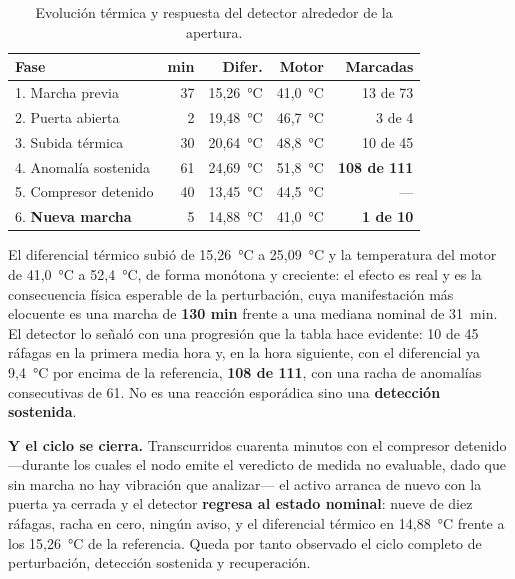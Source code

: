 \begin{table}[ht!]
\caption{Evolución térmica y respuesta del detector alrededor de la apertura.}
\label{table:puerta-termico}
\centering
\begin{tabular}{|p{4.4cm}|r|r|r|r|}
\hline
\textbf{Fase} & \textbf{min} & \textbf{Difer.} & \textbf{Motor} & \textbf{Marcadas} \\
\hline
1. Marcha previa & 37 & \mbox{15,26 °C} & \mbox{41,0 °C} & 13 de 73 \\
\hline
2. Puerta abierta & 2 & \mbox{19,48 °C} & \mbox{46,7 °C} & 3 de 4 \\
\hline
3. Subida térmica & 30 & \mbox{20,64 °C} & \mbox{48,8 °C} & 10 de 45 \\
\hline
4. Anomalía sostenida & 61 & \mbox{24,69 °C} & \mbox{51,8 °C} & \textbf{108 de 111} \\
\hline
5. Compresor detenido & 40 & \mbox{13,45 °C} & \mbox{44,5 °C} & --- \\
\hline
6. \textbf{Nueva marcha} & 5 & \mbox{14,88 °C} & \mbox{41,0 °C} & \textbf{1 de 10} \\
\hline
\end{tabular}
\end{table}

El diferencial térmico subió de \mbox{15,26 °C} a \mbox{25,09 °C} y la temperatura del motor de
\mbox{41,0 °C} a \mbox{52,4 °C}, de forma monótona y creciente: el efecto es real y es la
consecuencia física esperable de la perturbación, cuya manifestación más elocuente es una marcha
de \textbf{130 min} frente a una mediana nominal de \mbox{31 min}. El detector lo señaló con una
progresión que la tabla hace evidente: 10 de 45 ráfagas en la primera media hora y, en la hora
siguiente, con el diferencial ya \mbox{9,4 °C} por encima de la referencia, \textbf{108 de 111},
con una racha de anomalías consecutivas de 61. No es una reacción esporádica sino una
\textbf{detección sostenida}.

\textbf{Y el ciclo se cierra.} Transcurridos cuarenta minutos con el compresor detenido —durante
los cuales el nodo emite el veredicto de medida no evaluable, dado que sin marcha no hay
vibración que analizar— el activo arranca de nuevo con la puerta ya cerrada y el detector
\textbf{regresa al estado nominal}: nueve de diez ráfagas, racha en cero, ningún aviso, y el
diferencial térmico en \mbox{14,88 °C} frente a los \mbox{15,26 °C} de la referencia. Queda por
tanto observado el ciclo completo de perturbación, detección sostenida y recuperación.

